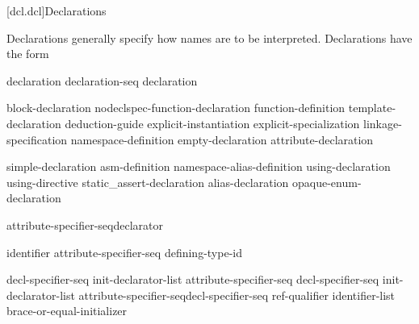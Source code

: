 [dcl.dcl]{Declarations}%



\pnum
Declarations generally specify how names are to be interpreted. Declarations have
the form

\begin{bnf}
\br
    declaration\br
    declaration-seq declaration
\end{bnf}

\begin{bnf}
\br
    block-declaration\br
    nodeclspec-function-declaration\br
    function-definition\br
    template-declaration\br
    deduction-guide\br
    explicit-instantiation\br
    explicit-specialization\br
    linkage-specification\br
    namespace-definition\br
    empty-declaration\br
    attribute-declaration
\end{bnf}

\begin{bnf}
\br
    simple-declaration\br
    asm-definition\br
    namespace-alias-definition\br
    using-declaration\br
    using-directive\br
    static_assert-declaration\br
    alias-declaration\br
    opaque-enum-declaration
\end{bnf}

\begin{bnf}
\br
    attribute-specifier-seq\opt declarator \terminal{;}
\end{bnf}

\begin{bnf}
\br
     identifier attribute-specifier-seq\opt{} \terminal{=} defining-type-id \terminal{;}
\end{bnf}

\begin{bnf}
\br
    decl-specifier-seq init-declarator-list\opt{} \terminal{;}\br
    attribute-specifier-seq decl-specifier-seq init-declarator-list \terminal{;}\br
    attribute-specifier-seq\opt decl-specifier-seq ref-qualifier\opt{}\br
    \hspace*{\bnfindentinc}\terminal{[} identifier-list \terminal{]} brace-or-equal-initializer \terminal{;}
\end{bnf}

